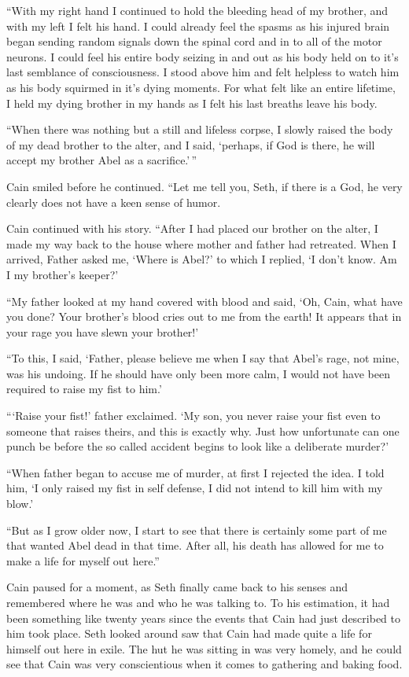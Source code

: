 \documentclass[12pt,twoside,titlepage]{report}
\begin{document}
``With my right hand I continued to hold the bleeding head of my
brother, and with my left I felt his hand. I could already feel the
spasms as his injured brain began sending random signals down the spinal
cord and in to all of the motor neurons. I could feel his entire body
seizing in and out as his body held on to it's last semblance of
consciousness. I stood above him and felt helpless to watch him as his
body squirmed in it's dying moments. For what felt like an entire
lifetime, I held my dying brother in my hands as I felt his last breaths
leave his body.

``When there was nothing but a still and lifeless corpse, I slowly
raised the body of my dead brother to the alter, and I said, `perhaps,
if God is there, he will accept my brother Abel as a sacrifice.'\,''

Cain smiled before he continued. ``Let me tell you, Seth, if there is a
God, he very clearly does not have a keen sense of humor.

Cain continued with his story. ``After I had placed our brother on the
alter, I made my way back to the house where mother and father had
retreated. When I arrived, Father asked me, `Where is Abel?' to which I
replied, `I don't know. Am I my brother's keeper?'

``My father looked at my hand covered with blood and said, `Oh, Cain,
what have you done? Your brother's blood cries out to me from the earth!
It appears that in your rage you have slewn your brother!'

``To this, I said, `Father, please believe me when I say that Abel's
rage, not mine, was his undoing. If he should have only been more calm,
I would not have been required to raise my fist to him.'

```Raise your fist!' father exclaimed. `My son, you never raise your
fist even to someone that raises theirs, and this is exactly why. Just
how unfortunate can one punch be before the so called accident begins to
look like a deliberate murder?'

``When father began to accuse me of murder, at first I rejected the
idea. I told him, `I only raised my fist in self defense, I did not
intend to kill him with my blow.'

``But as I grow older now, I start to see that there is certainly some
part of me that wanted Abel dead in that time. After all, his death has
allowed for me to make a life for myself out here.''

Cain paused for a moment, as Seth finally came back to his senses and
remembered where he was and who he was talking to. To his estimation, it
had been something like twenty years since the events that Cain had just
described to him took place. Seth looked around saw that Cain had made
quite a life for himself out here in exile. The hut he was sitting in
was very homely, and he could see that Cain was very conscientious when
it comes to gathering and baking food.
\end{document}
